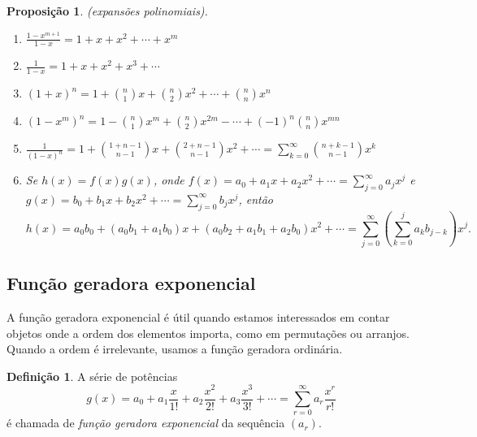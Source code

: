 \documentclass{article}
\theoremstyle{plain}
\newtheorem{prop}[thm]{Proposição}
\theoremstyle{definition}
\newtheorem{defn}[thm]{Definição}
\theoremstyle{remark}
\begin{document}
\begin{prop} (expansões polinomiais).
    \begin{enumerate}
        \item[\textup{(a)}] \(\displaystyle\frac{1-x^{m+1}}{1-x} = 1 + x + x^2 + \cdots + x^m\)
        \item[\textup{(b)}] \(\displaystyle\frac{1}{1-x} = 1 + x + x^2 + x^3 + \cdots\)
        \item[\textup{(c)}] \((1+x)^n = \displaystyle 1 + \binom{n}{1} x + \binom{n}{2} x^2 + \cdots + \binom{n}{n} x^n\)
        \item[\textup{(d)}] \((1-x^m)^n = \displaystyle 1 - \binom{n}{1} x^m + \binom{n}{2} x^{2m} - \cdots + (-1)^n \binom{n}{n} x^{mn}\)
        \item[\textup{(e)}] \(\displaystyle \frac{1}{(1-x)^n} = \displaystyle 1 + \binom{1+n-1}{n-1} x + \binom{2+n-1}{n-1} x^2 + \cdots = \sum_{k=0}^{\infty} \binom{n+k-1}{n-1} x^k\)
        \item[\textup{(f)}] Se \(h(x)=f(x)g(x)\), onde \(\displaystyle f(x)=a_0 + a_1 x + a_2 x^2 + \cdots = \sum_{j=0}^{\infty} a_j x^j\) e \(\displaystyle g(x)=b_0 + b_1 x + b_2 x^2 + \cdots = \sum_{j=0}^{\infty} b_j x^j\), então
        \begin{equation}
            h(x) = a_0b_0 + (a_0b_1 + a_1b_0)x + (a_0b_2 + a_1b_1 + a_2b_0)x^2 + \cdots = \sum_{j=0}^{\infty} \left( \sum_{k=0}^{j} a_k b_{j-k} \right) x^j.
        \end{equation}
    \end{enumerate}
\end{prop}

\subsection{Função geradora exponencial}

A função geradora exponencial é útil quando estamos interessados em contar objetos onde a ordem dos elementos importa, como em permutações ou arranjos. Quando a ordem é irrelevante, usamos a função geradora ordinária.

\begin{defn}
    A série de potências
    \begin{equation}
        g(x) = a_0 + a_1 \frac{x}{1!} + a_2 \frac{x^2}{2!} + a_3 \frac{x^3}{3!} + \cdots = \sum_{r=0}^{\infty} a_r \frac{x^r}{r!}
    \end{equation}
    \noindent é chamada de \emph{função geradora exponencial} da sequência \((a_r)\).
\end{defn}
\end{document}
